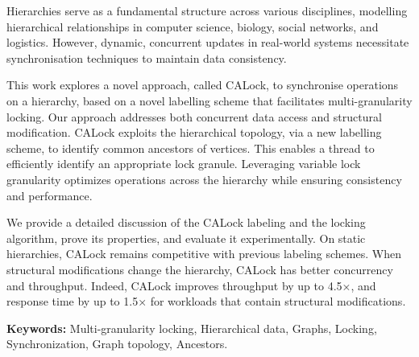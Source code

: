 %
\label{chap:abstract}

\vspace*{8mm}



Hierarchies serve as a fundamental structure across various disciplines, modelling hierarchical relationships in computer science, biology, social networks, and logistics.  However, dynamic, concurrent updates in real-world systems necessitate synchronisation techniques to maintain data consistency.

This work explores a novel approach, called CALock, to synchronise operations on a hierarchy, based on a novel labelling scheme that facilitates multi-granularity locking.  Our approach addresses both concurrent data access and structural modification. CALock exploits the hierarchical topology, via a new labelling scheme, to identify common ancestors of vertices. This enables a thread to efficiently identify an appropriate lock granule. Leveraging variable lock granularity optimizes operations across the hierarchy while ensuring consistency and performance.

We provide a detailed discussion of the CALock labeling and the locking algorithm, prove its properties, and evaluate it experimentally. On static hierarchies, CALock remains competitive with previous labeling schemes.  When structural modifications change the hierarchy, CALock has better concurrency and throughput.  Indeed, CALock improves throughput by up to 4.5×, and response time by up to 1.5× for workloads that contain structural modifications.


\textbf{Keywords:} 
Multi-granularity locking, Hierarchical data, Graphs, Locking, Synchronization, Graph topology, Ancestors. 
